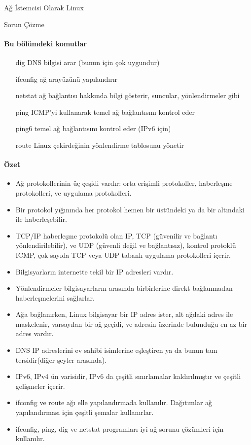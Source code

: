 \begin{section}{Ağ İstemcisi Olarak Linux}
\begin{subsection}{Sorun Çözme}
\paragraph{Bu bölümdeki komutlar}{
\begin{itemize}
\item[dig]DNS bilgisi arar (bunun için çok uygundur)
\item[ifconfig]ağ arayüzünü yapılandırır
\item[netstat]ağ bağlantısı hakkında bilgi gösterir, suncular, yönlendirmeler gibi
\item[ping]ICMP'yi kullanarak temel ağ bağlantısını kontrol eder
\item[ping6]temel ağ bağlantısını kontrol eder (IPv6 için)
\item[route]Linux çekirdeğinin yönlendirme tablosunu yönetir
\end{itemize}}

\paragraph{Özet}{
\begin{itemize}
\item Ağ protokollerinin üç çeşidi vardır: orta erişimli protokoller, haberleşme protokolleri, ve uygulama protokolleri.
\item Bir protokol yığınında her protokol hemen bir üstündeki ya da bir altındaki ile haberleşebilir.
\item TCP/IP haberleşme protokolü olan IP, TCP (güvenilir ve bağlantı yönlendirilebilir), ve UDP (güvenli değil ve bağlantısız), kontrol protoklü ICMP, çok sayıda TCP veya UDP tabanlı uygulama protokolleri içerir.
\item Bilgisyarların internette tekil bir IP adresleri vardır.
\item Yönlendirmeler bilgisayarların arasında birbirlerine direkt bağlanmadan haberleşmelerini sağlarlar.
\item Ağa bağlanırken, Linux bilgisayar bir IP adres ister, alt ağdaki adres ile maskelenir, varsayılan bir ağ geçidi, ve adresin üzerinde bulunduğu en az bir adres vardır. 
\item DNS IP adreslerini ev sahibi isimlerine eşleştiren ya da bunun tam tersidir(diğer şeyler arasında).
\item IPv6, IPv4 ün varisidir, IPv6 da çeşitli sınırlamalar kaldırılmıştır ve çeşitli gelişmeler içerir. 
\item ifconfig ve route ağı elle yapılandırmada kullanılır. Dağıtımlar ağ yapılandırması için çeşitli şemalar kullanırlar. 
\item ifconfig, ping, dig ve netstat programları iyi ağ sorunu çözümleri için kullanılır.
\end{itemize}
}
\end{subsection}
\end{section}
